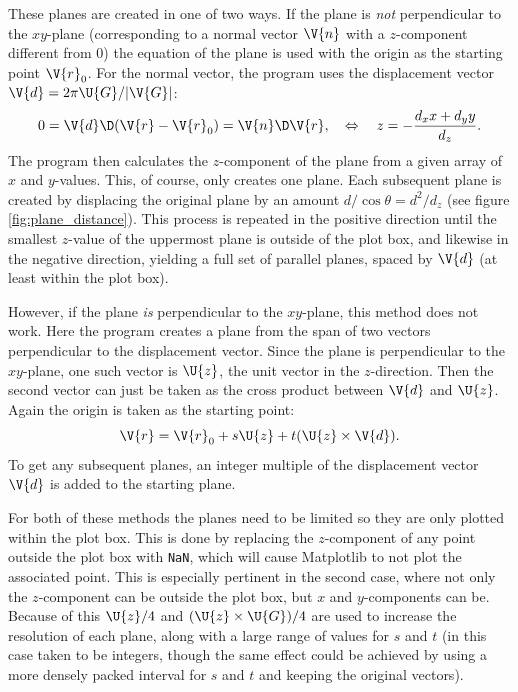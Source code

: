 \documentclass[main.tex]{subfiles}
\begin{document}
	These planes are created in one of two ways. If the plane is \textit{not} perpendicular to the $ xy $-plane (corresponding to a normal vector $ \V{n} $ with a $ z $-component different from 0) the equation of the plane is used with the origin as the starting point $ \V{r}_0 $. For the normal vector, the program uses the displacement vector $ \V{d} = 2\pi \U{G} / |\V{G}| $:
	\begin{equation}
		0 = \V{d} \D (\V{r}-\V{r}_0) = \V{n} \D \V{r}, \quad \Leftrightarrow \quad z = -\frac{d_x x + d_y y}{d_z}.
	\end{equation}
	The program then calculates the $ z $-component of the plane from a given array of $ x $ and $ y $-values. This, of course, only creates one plane. Each subsequent plane is created by displacing the original plane by an amount $ d/\cos \theta = d^2/d_z$ (see figure \ref{fig:plane_distance}). This process is repeated in the positive direction until the smallest $ z $-value of the uppermost plane is outside of the plot box, and likewise in the negative direction, yielding a full set of parallel planes, spaced by $ \V{d} $ (at least within the plot box).
	
	However, if the plane \textit{is} perpendicular to the $ xy $-plane, this method does not work. Here the program creates a plane from the span of two vectors perpendicular to the displacement vector. Since the plane is perpendicular to the $ xy $-plane, one such vector is $ \U{z} $, the unit vector in the $ z $-direction. Then the second vector can just be taken as the cross product between $ \V{d} $ and $ \U{z} $. Again the origin is taken as the starting point:
	\begin{equation}
		\V{r} = \V{r}_0 + s \U{z} + t (\U{z} \times \V{d}).
	\end{equation}
	To get any subsequent planes, an integer multiple of the displacement vector $ \V{d} $ is added to the starting plane.
	
	For both of these methods the planes need to be limited so they are only plotted within the plot box. This is done by replacing the $ z $-component of any point outside the plot box with \texttt{NaN}, which will cause Matplotlib to not plot the associated point. This is especially pertinent in the second case, where not only the $ z $-component can be outside the plot box, but $ x $ and $ y $-components can be. Because of this $ \U{z}/4 $ and $ (\U{z} \times \U{G})/4 $ are used to increase the resolution of each plane, along with a large range of values for $ s $ and $ t $ (in this case taken to be integers, though the same effect could be achieved by using a more densely packed interval for $ s $ and $ t $ and keeping the original vectors).
	
\end{document}
